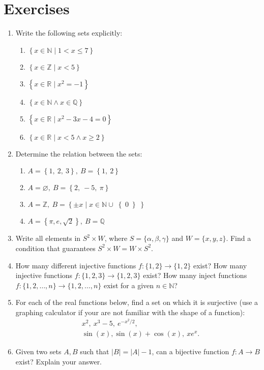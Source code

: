 \section{Exercises}
\begin{enumerate}
  \item Write the following sets explicitly:
    \begin{enumerate}[label=(\roman*)]
      \item $\left\{ x\in \mathbb{N}\mid1<x\leq7\right\}$
      \item $\left\{ x\in \mathbb{Z}\mid x<5\right\}$
      \item $\left\{ x\in \mathbb{R}\mid x^{2}=-1 \right\}$
      \item $\left\{ x\in \mathbb{N} \wedge x\in \mathbb{Q} \right\}$
      \item $\left\{ x\in \mathbb{R} \mid x^{2}-3x-4=0 \right\}$
      \item $\left\{ x\in\mathbb{R}\mid x<5\wedge x \geq 2\right\}$
    \end{enumerate}
  
	\item Determine the relation between the sets:
    \begin{enumerate}[label=(\roman*)]
      \item $A=\left\{ 1,\ 2,\ 3\right\},\ B=\left\{ 1,\ 2 \right\}$
      \item $A=\varnothing,\ B=\left\{ 2,\ -5,\ \pi \right\}$
      \item $A=\mathbb{Z},\ B=\left\{ \pm x \mid x\in\mathbb{N} \cup \right\{0\left\} \right\}$
			\item $A=\left\{\pi, e, \sqrt{2}\right\},\ B=\mathbb{Q}$
    \end{enumerate}

	\item Write all elements in $S^{2}\times W$, where $S=\{\alpha,\beta,\gamma\}$ and $W=\{x,y,z\}$. Find a condition that guarantees $S^{2}\times W = W\times S^{2}$.

	\item How many different injective functions $f:\{1,2\}\to\{1,2\}$ exist? How many injective functions $f:\{1,2,3\}\to\{1,2,3\}$ exist? How many inject functions $f:\{1,2,\dots,n\}\to\{1,2,\dots,n\}$ exist for a given $n\in\mathbb{N}$?

	\item For each of the real functions below, find a set on which it is surjective (use a graphing calculator if your are not familiar with the shape of a function):
		\begin{align*}
			&x^{2},\ x^{3}-5,\ e^{-x^{2}/2},\\
			&\sin(x), \sin(x)+\cos(x),\ xe^{x}.
		\end{align*}

	\item Given two sets $A,B$ such that $|B|=|A|-1$, can a bijective function $f:A\to B$ exist? Explain your answer.
\end{enumerate}
